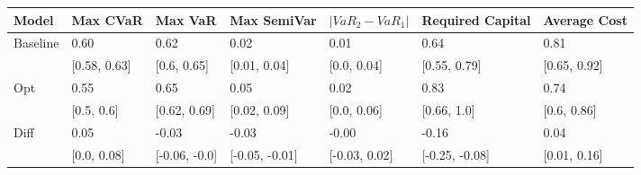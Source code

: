 \begin{tabular}{lllllll}
\toprule
   Model &     Max CVaR &       Max VaR &    Max SemiVar & $|VaR_2 - VaR_1|$ & Required Capital & Average Cost \\
\midrule
Baseline &         0.60 &          0.62 &           0.02 &              0.01 &             0.64 &         0.81 \\
         & [0.58, 0.63] &   [0.6, 0.65] &   [0.01, 0.04] &       [0.0, 0.04] &     [0.55, 0.79] & [0.65, 0.92] \\
     Opt &         0.55 &          0.65 &           0.05 &              0.02 &             0.83 &         0.74 \\
         &   [0.5, 0.6] &  [0.62, 0.69] &   [0.02, 0.09] &       [0.0, 0.06] &      [0.66, 1.0] &  [0.6, 0.86] \\
    Diff &         0.05 &         -0.03 &          -0.03 &             -0.00 &            -0.16 &         0.04 \\
         &  [0.0, 0.08] & [-0.06, -0.0] & [-0.05, -0.01] &     [-0.03, 0.02] &   [-0.25, -0.08] & [0.01, 0.16] \\
\bottomrule
\end{tabular}
